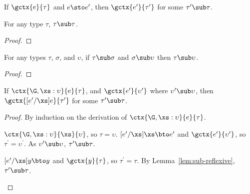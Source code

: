 \begin{theorem}[Preservation]\label{th:preservation}
  If $\gctx{e}{\tau}$ and $e \sto e^\prime$, then $\gctx{e^\prime}{\tau^\prime}$
  for some $\tau^\prime \sub \tau$.

  \begin{lemma}\label{lem:sub-reflexive}
    For any type $\tau$, $\tau \sub \tau$.

    \begin{proof}

    \end{proof}
  \end{lemma}

  \begin{lemma}\label{lem:sub-transitive}
    For any types $\tau$, $\sigma$, and $\upsilon$, if $\tau \sub \sigma$ and
    $\sigma \sub \upsilon$ then $\tau \sub \upsilon$.

    \begin{proof}

    \end{proof}
  \end{lemma}

  \begin{lemma}\label{lem:preservation}
    If $\ctx{\G, \xs : \upsilon}{e}{\tau}$, and
    $\gctx{e^\prime}{\upsilon^\prime}$ where $\upsilon^\prime \sub \upsilon$,
    then $\gctx{[e^\prime/\xs]e}{\tau^\prime}$ for some $\tau^\prime \sub \tau$.

    \begin{proof}
      By induction on the derivation of $\ctx{\G, \xs : \upsilon}{e}{\tau}$.

      \begin{match}
        $\ctx{\G, \xs : \upsilon}{\xs}{\upsilon}$, so $\tau = \upsilon$.
        $[e^\prime/\xs]\xs \bto e^\prime$ and $\gctx{e^\prime}{\upsilon^\prime}$,
        so $\tau^\prime = \upsilon^\prime$.  As $\upsilon^\prime \sub \upsilon$,
        $\tau^\prime \sub \tau$.

        $[e^\prime/\xs]y \bto y$ and $\gctx{y}{\tau}$, so $\tau^\prime = \tau$.
        By Lemma~\ref{lem:sub-reflexive}, $\tau^\prime \sub \tau$.


\end{match}
\end{proof}
\end{lemma}
\end{theorem}
